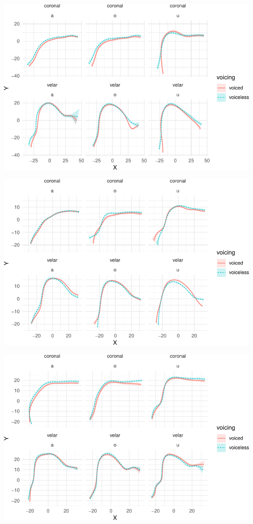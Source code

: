 \documentclass[12pt,]{article}
\begin{document}
\begin{center}\includegraphics{2018-polar-gam_files/figure-latex/unnamed-chunk-2-1} \end{center}

\begin{center}\includegraphics{2018-polar-gam_files/figure-latex/unnamed-chunk-3-1} \end{center}

\begin{center}\includegraphics{2018-polar-gam_files/figure-latex/unnamed-chunk-4-1} \end{center}


\end{document}
